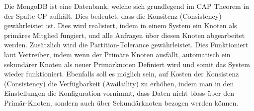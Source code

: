 Die MongoDB ist eine Datenbank, welche sich grundlegend im CAP Theorem in der Spalte CP aufhält. Dies bedeutet, dass die Konsitenz (Consistency) gewährleistet ist. Dies wird realisiert, indem in einem System ein Knoten als primäres Mitglied fungiert, und alle Anfragen über diesen Knoten abgearbeitet werden. Zusätzlich wird die Partition-Tolerance gewährleistet. Dies Funktioniert laut Vertreiber, indem wenn der Primäre Knoten ausfällt, automatisch ein sekundärer Knoten als neuer Primärknoten Definiert wird und somit das System wieder funktioniert.
Ebenfalls soll es möglich sein, auf Kosten der Konsistenz (Consistency) die Verfügbarkeit (Availaility) zu erhöhen, indem man in den Einstellungen die Konfiguration vornimmt, dass Daten nicht bloss über den Primär-Knoten, sondern auch über Sekundärknoten bezogen werden können.



